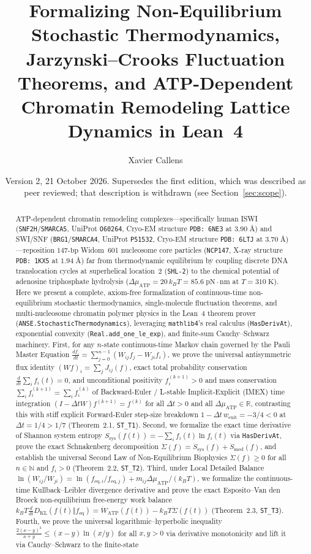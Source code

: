 \documentclass[11pt,a4paper]{article}
\title{\textbf{Formalizing Non-Equilibrium Stochastic Thermodynamics, Jarzynski--Crooks Fluctuation Theorems, and ATP-Dependent Chromatin Remodeling Lattice Dynamics in Lean~4}}
\author{Xavier Callens}
\date{Version 2, 21 October 2026. Supersedes the first edition, which was described as peer reviewed; that description is withdrawn (see Section~\ref{sec:scope}).}
\theoremstyle{definition}
\begin{document}
\maketitle

\begin{abstract}
ATP-dependent chromatin remodeling complexes---specifically human ISWI (\texttt{SNF2H}/\texttt{SMARCA5}, UniProt \texttt{O60264}, Cryo-EM structure \texttt{PDB: 6NE3} at $3.90\;\text{\AA}$) and SWI/SNF (\texttt{BRG1}/\texttt{SMARCA4}, UniProt \texttt{P51532}, Cryo-EM structure \texttt{PDB: 6LTJ} at $3.70\;\text{\AA}$)---reposition $147\text{-bp}$ Widom~601 nucleosome core particles (\texttt{NCP147}, X-ray structure \texttt{PDB: 1KX5} at $1.94\;\text{\AA}$) far from thermodynamic equilibrium by coupling discrete DNA translocation cycles at superhelical location~2 (\texttt{SHL-2}) to the chemical potential of adenosine triphosphate hydrolysis ($\Delta\mu_{\mathrm{ATP}} = 20\,k_B T = 85.6\;\mathrm{pN\cdot nm}$ at $T = 310\;\mathrm{K}$). Here we present a complete, axiom-free formalization of continuous-time non-equilibrium stochastic thermodynamics, single-molecule fluctuation theorems, and multi-nucleosome chromatin polymer physics in the Lean~4 theorem prover (\texttt{ANSE.StochasticThermodynamics}), leveraging \texttt{mathlib4}'s real calculus (\texttt{HasDerivAt}), exponential convexity (\texttt{Real.add\_one\_le\_exp}), and finite-sum Cauchy--Schwarz machinery. First, for any $n$-state continuous-time Markov chain governed by the Pauli Master Equation $\frac{df_i}{dt} = \sum_{j=0}^{n-1}(W_{ij}f_j - W_{ji}f_i)$, we prove the universal antisymmetric flux identity $(Wf)_i = \sum_j J_{ij}(f)$, exact total probability conservation $\frac{d}{dt}\sum_i f_i(t) = 0$, and unconditional positivity $f_i^{(k+1)} > 0$ and mass conservation $\sum_i f_i^{(k+1)} = \sum_i f_i^{(k)}$ of Backward-Euler / L-stable Implicit-Explicit (IMEX) time integration $(I - \Delta t W)f^{(k+1)} = f^{(k)}$ for all $\Delta t > 0$ and all $\Delta\mu_{\mathrm{ATP}} \in \mathbb{R}$, contrasting this with stiff explicit Forward-Euler step-size breakdown $1 - \Delta t\,w_{\mathrm{exit}} = -3/4 < 0$ at $\Delta t = 1/4 > 1/7$ (Theorem~2.1, \texttt{ST\_T1}). Second, we formalize the exact time derivative of Shannon system entropy $S_{\mathrm{sys}}(f(t)) = -\sum_i f_i(t)\ln f_i(t)$ via \texttt{HasDerivAt}, prove the exact Schnakenberg decomposition $\dot{\Sigma}(f) = \dot{S}_{\mathrm{sys}}(f) + \dot{S}_{\mathrm{med}}(f)$, and establish the universal Second Law of Non-Equilibrium Biophysics $\dot{\Sigma}(f) \ge 0$ for all $n \in \mathbb{N}$ and $f_i > 0$ (Theorem~2.2, \texttt{ST\_T2}). Third, under Local Detailed Balance $\ln(W_{ij}/W_{ji}) = \ln(f_{\mathrm{eq},i}/f_{\mathrm{eq},j}) + m_{ij}\Delta\mu_{\mathrm{ATP}}/(k_B T)$, we formalize the continuous-time Kullback--Leibler divergence derivative and prove the exact Esposito--Van den Broeck non-equilibrium free-energy work balance $k_B T \frac{d}{dt}D_{\mathrm{KL}}(f(t)\Vert f_{\mathrm{eq}}) = \dot{W}_{\mathrm{ATP}}(f(t)) - k_B T \dot{\Sigma}(f(t))$ (Theorem~2.3, \texttt{ST\_T3}). Fourth, we prove the universal logarithmic--hyperbolic inequality $\frac{2(x-y)^2}{x+y} \le (x-y)\ln(x/y)$ for all $x, y > 0$ via derivative monotonicity and lift it via Cauchy--Schwarz to the finite-state 
\end{abstract}
\end{document}
